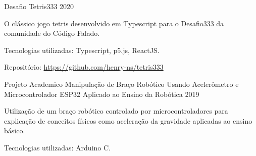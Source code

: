 \begin{cventries}
  \cventry
  {Desafio} %
  {Tetris333} %
  {} %
  {2020} %
  {
    \begin{cvitems} %
      \item {O clássico jogo tetris desenvolvido em Typescript para o Desafio333 da comunidade do Código Falado.}
      \item {Tecnologias utilizadas: Typescript,  p5.js, ReactJS.}
      \item {Repositório: \url{https://github.com/henry-ns/tetris333}}
    \end{cvitems}
  }

  \cventry
  {Projeto Academico} %
  {Manipulação de Braço Robótico Usando Acelerômetro e Microcontrolador ESP32 Aplicado ao Ensino da Robótica} %
  {} %
  {2019} %
  {
    \begin{cvitems} %
      \item {Utilização de um braço robótico controlado por microcontroladores para explicação de conceitos físicos como aceleração da gravidade aplicadas ao ensino básico.}
      \item {Tecnologias utilizadas: Arduino C.}
    \end{cvitems}
  }


\end{cventries}